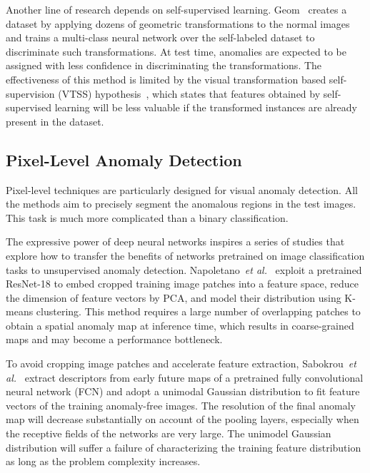 \documentclass[final]{cvpr}
\begin{document}
{Another line of research depends on self-supervised learning. Geom~\cite{Golan2018} creates a dataset by applying dozens of geometric transformations to the normal images and trains a multi-class neural network over the self-labeled dataset to discriminate such transformations. At test time, anomalies are expected to be assigned with less confidence in discriminating the transformations. The effectiveness of this method is limited by the visual transformation based self-supervision (VTSS) hypothesis~\cite{Pal2019}, which states that features obtained by self-supervised learning will be less valuable if the transformed instances are already present in the dataset.

\subsection{Pixel-Level Anomaly Detection}
\label{sec2-sub2}

Pixel-level techniques are particularly designed for visual anomaly detection. All the methods aim to precisely segment the anomalous regions in the test images. This task is much more complicated than a binary classification.

The expressive power of deep neural networks inspires a series of studies that explore how to transfer the benefits of networks pretrained on image classification tasks to unsupervised anomaly detection. Napoletano~\textit{et al.}~\cite{Napoletano2018} exploit a pretrained ResNet-18 to embed cropped training image patches into a feature space, reduce the dimension of feature vectors by PCA, and model their distribution using K-means clustering. This method requires a large number of overlapping patches to obtain a spatial anomaly map at inference time, which results in coarse-grained maps and may become a performance bottleneck.

To avoid cropping image patches and accelerate feature extraction, Sabokrou~\textit{et al.}~\cite{Sabokrou2018} extract descriptors from early future maps of a pretrained fully convolutional neural network (FCN) and adopt a unimodal Gaussian distribution to fit feature vectors of the training anomaly-free images. The resolution of the final anomaly map will decrease substantially on account of the pooling layers, especially when the receptive fields of the networks are very large. The unimodel Gaussian distribution will suffer a failure of characterizing the training feature distribution as long as the problem complexity increases.

}
\end{document}
